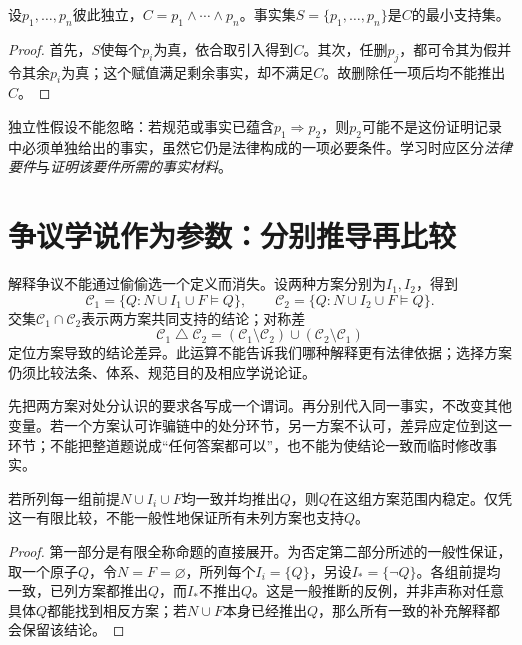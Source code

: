 \begin{modelprop}[纯合取的逐项缺失反例]
设$p_1,\ldots,p_n$彼此独立，$C=p_1\wedge\cdots\wedge p_n$。事实集$S=\{p_1,\ldots,p_n\}$是$C$的最小支持集。
\end{modelprop}
\begin{proof}
首先，$S$使每个$p_i$为真，依合取引入得到$C$。其次，任删$p_j$，都可令其为假并令其余$p_i$为真；这个赋值满足剩余事实，却不满足$C$。故删除任一项后均不能推出$C$。
\end{proof}

独立性假设不能忽略：若规范或事实已蕴含$p_1\Rightarrow p_2$，则$p_2$可能不是这份证明记录中必须单独给出的事实，虽然它仍是法律构成的一项必要条件。学习时应区分\emph{法律要件}与\emph{证明该要件所需的事实材料}。


\section{争议学说作为参数：分别推导再比较}
解释争议不能通过偷偷选一个定义而消失。设两种方案分别为$I_1,I_2$，得到
\[
 \mathcal C_1=\{Q:N\cup I_1\cup F\models Q\},\qquad
 \mathcal C_2=\{Q:N\cup I_2\cup F\models Q\}.
\]
交集$\mathcal C_1\cap\mathcal C_2$表示两方案共同支持的结论；对称差
\[
 \mathcal C_1\mathbin{\triangle}\mathcal C_2
 =(\mathcal C_1\setminus\mathcal C_2)\cup(\mathcal C_2\setminus\mathcal C_1)
\]
定位方案导致的结论差异。此运算不能告诉我们哪种解释更有法律依据；选择方案仍须比较法条、体系、规范目的及相应学说论证。

先把两方案对处分认识的要求各写成一个谓词。再分别代入同一事实，不改变其他变量。若一个方案认可诈骗链中的处分环节，另一方案不认可，差异应定位到这一环节；不能把整道题说成“任何答案都可以”，也不能为使结论一致而临时修改事实。

\begin{modelprop}[共同结论对所列方案的稳定性]
若所列每一组前提$N\cup I_i\cup F$均一致并均推出$Q$，则$Q$在这组方案范围内稳定。仅凭这一有限比较，不能一般性地保证所有未列方案也支持$Q$。
\end{modelprop}
\begin{proof}
第一部分是有限全称命题的直接展开。为否定第二部分所述的一般性保证，取一个原子$Q$，令$N=F=\varnothing$，所列每个$I_i=\{Q\}$，另设$I_*=\{\neg Q\}$。各组前提均一致，已列方案都推出$Q$，而$I_*$不推出$Q$。这是一般推断的反例，并非声称对任意具体$Q$都能找到相反方案；若$N\cup F$本身已经推出$Q$，那么所有一致的补充解释都会保留该结论。
\end{proof}

